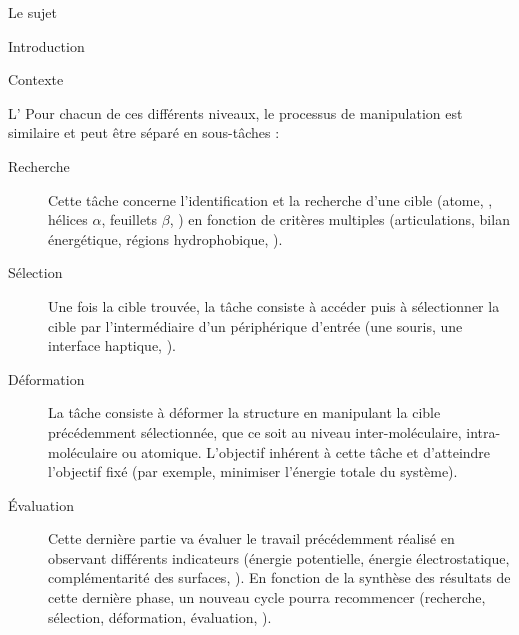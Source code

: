 \documentclass[myfrancais]{mythesis}
\begin{document}
\begin{mypart}{Le sujet}
\begin{mychapter}{Introduction}
\begin{mysection}{Contexte}
\begin{mysubsection}{L'}
					Pour chacun de ces différents niveaux, le processus de manipulation est similaire et peut être séparé en sous-tâches :
					\begin{description}
						\item[Recherche] Cette tâche concerne l'identification et la recherche d'une cible (atome, , hélices $\alpha$, feuillets $\beta$, \myetc) en fonction de critères multiples (articulations, bilan énergétique, régions hydrophobique, \myetc).
						\item[Sélection] Une fois la cible trouvée, la tâche consiste à accéder puis à sélectionner la cible par l'intermédiaire d'un périphérique d'entrée (une souris, une interface haptique, \myetc).
						\item[Déformation] La tâche consiste à déformer la structure en manipulant la cible précédemment sélectionnée, que ce soit au niveau inter-moléculaire, intra-moléculaire ou atomique.
							L'objectif inhérent à cette tâche et d'atteindre l'objectif fixé (par exemple, minimiser l'énergie totale du système).
						\item[Évaluation] Cette dernière partie va évaluer le travail précédemment réalisé en observant différents indicateurs (énergie potentielle, énergie électrostatique, complémentarité des surfaces, \myetc).
							En fonction de la synthèse des résultats de cette dernière phase, un nouveau cycle pourra recommencer (recherche, sélection, déformation, évaluation, \myetc).
					\end{description}

				\end{mysubsection}
			\end{mysection}
		\end{mychapter}
	\end{mypart}
\end{document}
